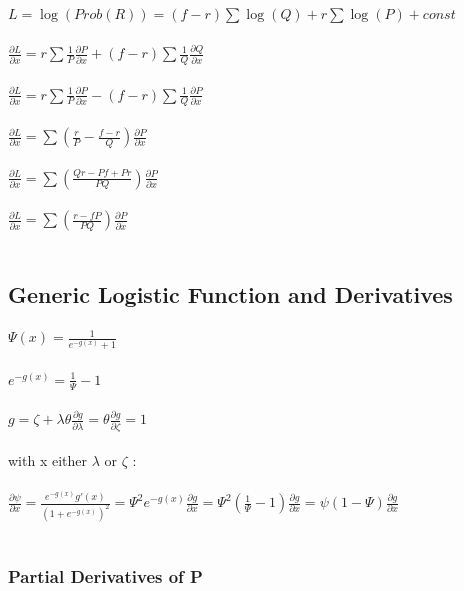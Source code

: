 \documentclass{article}
\begin{document}
$L=\log (Prob(R))=(f-r) \sum \log (Q)+r \sum \log (P)+const$
\\\\
$\frac{\partial L}{\partial x}=r \sum \frac{1}{P}\frac{\partial P}{\partial x}+(f-r)\sum \frac{1}{Q}\frac{\partial Q}{\partial x}$
\\\\
$\frac{\partial L}{\partial x}=r \sum \frac{1}{P}\frac{\partial P}{\partial x}-(f-r)\sum \frac{1}{Q}\frac{\partial P}{\partial x}$
\\\\
$\frac{\partial L}{\partial x}=\sum (\frac{r}{P}-\frac{f-r}{Q})\frac{\partial P}{\partial x}$
\\\\
$\frac{\partial L}{\partial x}=\sum (\frac{Q r-P f+P r}{P Q})\frac{\partial P}{\partial x}$
\\\\
$\frac{\partial L}{\partial x}=\sum (\frac{ r-f P}{P Q})\frac{\partial P}{\partial x}$
\\\\
\subsection{Generic Logistic Function and Derivatives}

$\Psi (x)=\frac{1}{e^{-g(x)}+1}$
\\\\
$e^{-g(x)}=\frac{1}{\Psi }-1$
\\\\
$g=\zeta +\lambda \theta \frac{\partial g}{\partial \lambda }=\theta \frac{\partial g}{\partial \zeta }=1$
\\\\
with x either $\lambda$ or $\zeta$ :
\\\\
$\frac{\partial \psi }{\partial x}=\frac{e^{-g(x)} g'(x)}{(1+e^{-g(x)})^2}=\Psi ^2e^{-g(x)} \frac{\partial g}{\partial x}=\Psi ^2(\frac{1}{\Psi }-1)\frac{\partial g}{\partial x}=\psi (1-\Psi )\frac{\partial g}{\partial x}$
\\\\
\subsubsection{Partial Derivatives of P}
\end{document}
